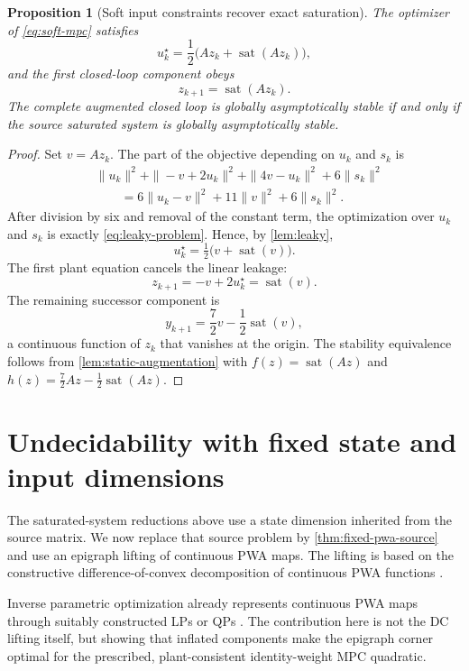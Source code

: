 \documentclass{IEEEtran}
\newtheorem{proposition}[theorem]{Proposition}
\theoremstyle{remark}
\newcommand{\sat}{\operatorname{sat}}
\begin{document}
\begin{proposition}[Soft input constraints recover exact saturation]
\label{prop:soft}
The optimizer of \eqref{eq:soft-mpc} satisfies
\[
  u_k^\star=\frac12\bigl(Az_k+\sat(Az_k)\bigr),
\]
and the first closed-loop component obeys
\[
  z_{k+1}=\sat(Az_k).
\]
The complete augmented closed loop is globally asymptotically stable if and only if the source saturated system is globally asymptotically stable.
\end{proposition}

\begin{proof}
Set $v=Az_k$.  The part of the objective depending on $u_k$ and $s_k$ is
\begin{align*}
 &\|u_k\|^2+\|-v+2u_k\|^2+\|4v-u_k\|^2+6\|s_k\|^2\\
 &\qquad=6\|u_k-v\|^2+11\|v\|^2+6\|s_k\|^2.
\end{align*}
After division by six and removal of the constant term, the optimization over $u_k$ and $s_k$ is exactly \eqref{eq:leaky-problem}.  Hence, by \cref{lem:leaky},
\[
  u_k^\star=\tfrac12\bigl(v+\sat(v)\bigr).
\]
The first plant equation cancels the linear leakage:
\[
  z_{k+1}=-v+2u_k^\star=\sat(v).
\]
The remaining successor component is
\[
  y_{k+1}=\frac72v-\frac12\sat(v),
\]
a continuous function of $z_k$ that vanishes at the origin.  The stability equivalence follows from \cref{lem:static-augmentation} with $f(z)=\sat(Az)$ and $h(z)=\tfrac72Az-\tfrac12\sat(Az)$.
\end{proof}

\section{Undecidability with fixed state and input dimensions}
\label{sec:fixed-dimension}

The saturated-system reductions above use a state dimension inherited from the
source matrix.  We now replace that source problem by
\cref{thm:fixed-pwa-source} and use an epigraph lifting of continuous PWA maps.
The lifting is based on the constructive difference-of-convex decomposition of
continuous PWA functions \cite{KripfganzSchulze1987,HempelEtAl2013}.

Inverse parametric optimization already represents continuous PWA maps through
suitably constructed LPs or QPs \cite{HempelEtAl2013,HempelEtAl2015}.  The
contribution here is not the DC lifting itself, but showing that inflated
components make the epigraph corner optimal for the prescribed,
plant-consistent identity-weight MPC quadratic.
\end{document}

